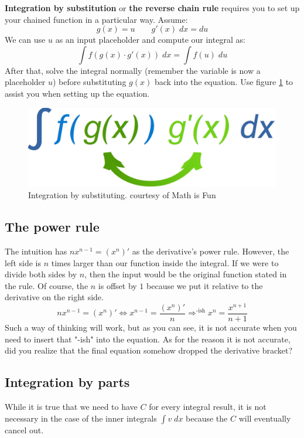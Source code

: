 \textbf{Integration by substitution} or \textbf{the reverse chain rule} requires you to set up your chained function in a particular way. Assume:
\[
    g(x)=u
    \qquad
    g'(x) \;dx=du
\]
We can use $u$ as an input placeholder and compute our integral as:
\begin{equation}
    \int f(g(x) \cdot g'(x)) \;dx
    = \int f(u) \;du
\end{equation}
After that, solve the integral normally (remember the variable is now a placeholder $u$) before substituting $g(x)$ back into the equation. Use figure \ref{fig:m17} to assist you when setting up the equation.
\begin{figure}
    \centering
    \includegraphics[width=0.4\linewidth]{math/17.png}
    \caption{Integration by substituting. courtesy of Math is Fun}
    \label{fig:m17}
\end{figure}

\subsection{The power rule}
The intuition has $nx^{n-1} = (x^n)'$ as the derivative's power rule. However, the left side is $n$ times larger than our function inside the integral. If we were to divide both sides by $n$, then the input would be the original function stated in the rule. Of course, the $n$ is offset by $1$ because we put it relative to the derivative on the right side.
\[
    nx^{n-1} = (x^n)'
    \Leftrightarrow x^{n-1} = \frac{(x^n)'}{n}
    \Rightarrow^{\text{-ish}} x^{n} = \frac{x^{n+1}}{n+1}
\]
Such a way of thinking will work, but as you can see, it is not accurate when you need to insert that "-ish" into the equation. As for the reason it is not accurate, did you realize that the final equation somehow dropped the derivative bracket?

\subsection{Integration by parts}
While it is true that we need to have $C$ for every integral result, it is not necessary in the case of the inner integrals $\int v\;dx$ because the $C$ will eventually cancel out.

